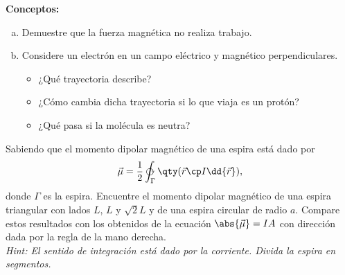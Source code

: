 \begin{mdframed}[style=warning]
	\begin{ejercicio}
		\textbf{Conceptos: }
		\begin{enumerate}[a)]
			\item Demuestre que la fuerza magnética no realiza trabajo.
			\item Considere un electrón en un campo eléctrico y magnético perpendiculares.
			\begin{itemize}
				\item ¿Qué trayectoria describe?
				\item ¿Cómo cambia dicha trayectoria si lo que viaja es un protón?
				\item ¿Qué pasa si la molécula es neutra?
			\end{itemize}
		\end{enumerate}
	\end{ejercicio}
\end{mdframed}











\begin{mdframed}[style=warning]
	\begin{ejercicio}
		Sabiendo que el momento dipolar magnético de una espira está dado por
		$$ \vec{\mu} = \frac{1}{2} \varointclockwise _{\Gamma} \qty(\vec{r} \cp I\dd{\vec{r}}), $$
		donde $\Gamma$ es la espira. Encuentre el momento dipolar magnético de una espira triangular con lados $L$, $L$ y $\sqrt{2} L$ y de una espira circular de radio $a$. Compare estos resultados con los obtenidos de la ecuación $\abs{\vec{\mu}} = IA$ con dirección dada por la regla de la mano derecha. \\
		\textit{Hint: El sentido de integración está dado por la corriente. Divida la espira en segmentos.}
	\end{ejercicio}
\end{mdframed}



















